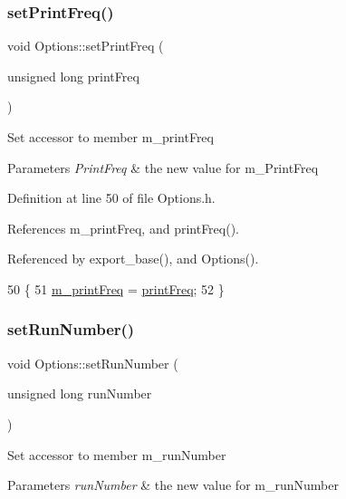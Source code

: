 \subsubsection{\texorpdfstring{set\+Print\+Freq()}{setPrintFreq()}}
{\footnotesize\ttfamily void Options\+::set\+Print\+Freq (\begin{DoxyParamCaption}\item[{unsigned long}]{print\+Freq }\end{DoxyParamCaption})\hspace{0.3cm}{\ttfamily [inline]}}

Set accessor to member m\+\_\+print\+Freq 
\begin{DoxyParams}{Parameters}
{\em Print\+Freq} & the new value for m\+\_\+\+Print\+Freq \\
\hline
\end{DoxyParams}


Definition at line 50 of file Options.\+h.



References m\+\_\+print\+Freq, and print\+Freq().



Referenced by export\+\_\+base(), and Options().


\begin{DoxyCode}
50                                                     \{
51                 \hyperlink{classOptions_acf8f96cbc3245ec4b3b47bd3bfa0d742}{m\_printFreq} = \hyperlink{classOptions_a67021ffef9f666bba4696f89807b2a70}{printFreq};
52         \}
\end{DoxyCode}
\mbox{\label{classOptions_aed19a55eb2c418f333bc97615cf4a3a8}} 
\subsubsection{\texorpdfstring{set\+Run\+Number()}{setRunNumber()}}
{\footnotesize\ttfamily void Options\+::set\+Run\+Number (\begin{DoxyParamCaption}\item[{unsigned long}]{run\+Number }\end{DoxyParamCaption})\hspace{0.3cm}{\ttfamily [inline]}}

Set accessor to member m\+\_\+run\+Number 
\begin{DoxyParams}{Parameters}
{\em run\+Number} & the new value for m\+\_\+run\+Number \\
\hline
\end{DoxyParams}


